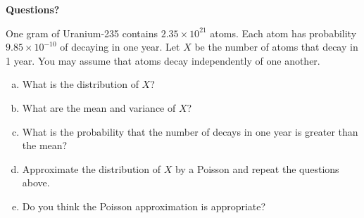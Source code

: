 \begin{frame}
  \begin{center}
    \Large{\textbf{Questions?}}
  \end{center}
\end{frame}

\begin{frame}
  \begin{block}{\exercise}
  One gram of Uranium-235 contains $2.35 \times 10^{21}$ atoms. Each atom has probability $9.85 \times 10^{-10}$ of decaying in one year. Let $X$ be the number of atoms that decay in 1 year. You may assume that atoms decay independently of one another.
  
  \begin{enumerate}[a)]
  \item What is the distribution of $X$?
  \item What are the mean and variance of $X$?
  \item What is the probability that the number of decays in one year is greater than the mean?
  \item Approximate the distribution of $X$ by a Poisson and repeat the questions above. 
  \item Do you think the Poisson approximation is appropriate?
  \end{enumerate}
  \end{block}
\end{frame}



